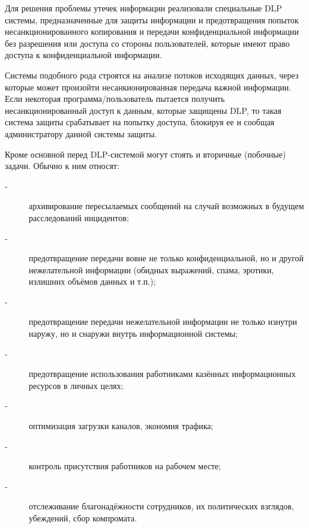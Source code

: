 Для решения проблемы утечек информации реализовали специальные DLP системы, предназначенные для защиты информации и предотвращения попыток несанкционированного копирования и передачи конфиденциальной информации без разрешения или доступа со стороны пользователей, которые имеют право доступа к конфиденциальной информации.

Системы подобного рода строятся на анализе потоков исходящих данных, через которые может произойти несанкионированная передача важной информации. Если некоторая программа/пользователь пытается получить несанкционированный доступ к данным, которые защищены DLP, то такая система защиты срабатывает на попытку доступа, блокируя ее и сообщая администратору данной системы защиты.

Кроме основной перед DLP-системой могут стоять и вторичные (побочные) задачи. Обычно к ним относят:

\begin{description}
	\item[-]
		архивирование пересылаемых сообщений на случай возможных в будущем расследований инцидентов;
	\item[-]
	    предотвращение передачи вовне не только конфиденциальной, но и другой нежелательной информации (обидных выражений, спама, эротики, излишних объёмов данных и т.п.);
	\item[-]
	    предотвращение передачи нежелательной информации не только изнутри наружу, но и снаружи внутрь информационной системы;
	\item[-]
	    предотвращение использования работниками казённых информационных ресурсов в личных целях;
	\item[-]
	    оптимизация загрузки каналов, экономия трафика;
	\item[-]
         контроль присутствия работников на рабочем месте;
	\item[-]
	    отслеживание благонадёжности сотрудников, их политических взглядов, убеждений, сбор компромата.
\end{description}


